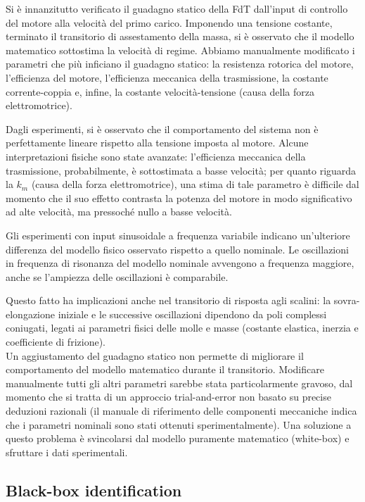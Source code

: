Si è innanzitutto verificato il guadagno statico della FdT dall'input di controllo del motore alla velocità del primo carico. Imponendo una tensione costante, terminato il transitorio di assestamento della massa, si è osservato che il modello matematico sottostima la velocità di regime.
Abbiamo manualmente modificato i parametri che più inficiano il guadagno statico: la resistenza rotorica del motore, l'efficienza del motore, l'efficienza meccanica della trasmissione, la costante corrente-coppia e, infine, la costante velocità-tensione (causa della forza elettromotrice).

Dagli esperimenti, si è osservato che il comportamento del sistema non è perfettamente lineare rispetto alla tensione imposta al motore. Alcune interpretazioni fisiche sono state avanzate: l'efficienza meccanica della trasmissione, probabilmente, è sottostimata a basse velocità; per quanto riguarda la $k_m$ (causa della forza elettromotrice), una stima di tale parametro è difficile dal momento che il suo effetto contrasta la potenza del motore in modo significativo ad alte velocità, ma pressoché nullo a basse velocità.

Gli esperimenti con input sinusoidale a frequenza variabile indicano un'ulteriore differenza del modello fisico osservato rispetto a quello nominale. Le oscillazioni in frequenza di risonanza del modello nominale avvengono a frequenza maggiore, anche se l'ampiezza delle oscillazioni è comparabile.


Questo fatto ha implicazioni anche nel transitorio di risposta agli scalini: la sovra-elongazione iniziale e le successive oscillazioni dipendono da poli complessi coniugati, legati ai parametri fisici delle molle e masse (costante elastica, inerzia e coefficiente di frizione). \\
Un aggiustamento del guadagno statico non permette di migliorare il comportamento del modello matematico durante il transitorio. Modificare manualmente tutti gli altri parametri sarebbe stata particolarmente gravoso, dal momento che si tratta di un approccio trial-and-error non basato su precise deduzioni razionali (il manuale di riferimento delle componenti meccaniche indica che i parametri nominali sono stati ottenuti sperimentalmente).
Una soluzione a questo problema è svincolarsi dal modello puramente matematico (white-box) e sfruttare i dati sperimentali.

\subsection{Black-box identification}

